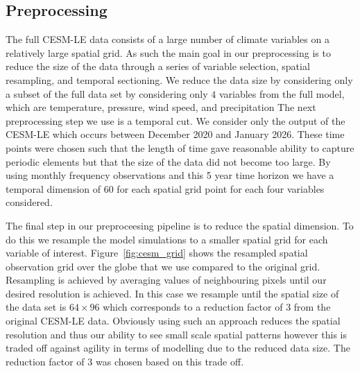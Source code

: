  \subsection{Preprocessing \label{sec:preprocessing}}
 The full CESM-LE data consists of a large number of climate variables on a relatively large spatial grid. 
 As such the main goal in our preprocessing is to reduce the size of the data through a series of variable selection, spatial resampling, and temporal sectioning. 
 We reduce the data size by considering only a subset of the full data set by considering only $4$ variables from the full model, which are temperature, pressure, wind speed, and precipitation
 The next preprocessing step we use is a temporal cut.
 We consider only the output of the CESM-LE which occurs between December 2020 and January 2026. 
 These time points were chosen such that the length of time gave reasonable ability to capture periodic elements but that the size of the data did not become too large.
 By using monthly frequency observations and this 5 year time horizon we have a temporal dimension of 60 for each spatial grid point for each four variables considered. 
 
 The final step in our preproceesing pipeline is to reduce the spatial dimension.
 To do this we resample the model simulations to a smaller spatial grid for each variable of interest.
 Figure~\ref{fig:cesm_grid} shows the resampled spatial observation grid over the globe that we use compared to the original grid.
 Resampling is achieved by averaging values of neighbouring pixels until our desired resolution is achieved.
 In this case we resample until the spatial size of the data set is $64 \times 96$ which corresponds to a reduction factor of $3$ from the original CESM-LE data.
 Obviously using such an approach reduces the spatial resolution and thus our ability to see small scale spatial patterns however this is traded off against agility in terms of modelling due to the reduced data size.
 The reduction factor of $3$ was chosen based on this trade off.
 
